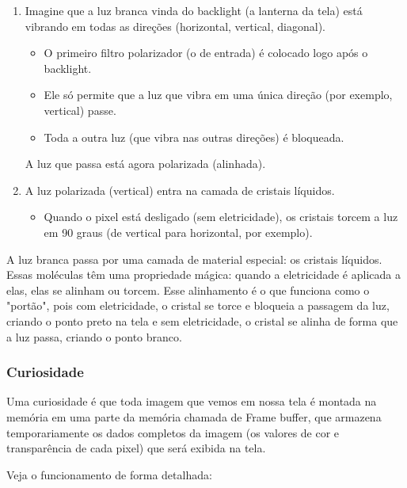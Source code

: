 \documentclass[12pt,a4paper]{report}
\begin{document}
	\begin{enumerate}
		\item Imagine que a luz branca vinda do backlight (a lanterna da tela) está vibrando em todas as direções (horizontal, vertical, diagonal).
		\begin{itemize}
			\item O primeiro filtro polarizador (o de entrada) é colocado logo após o backlight.
			\item Ele só permite que a luz que vibra em uma única direção (por exemplo, vertical) passe.
			\item Toda a outra luz (que vibra nas outras direções) é bloqueada.
		\end{itemize}
		A luz que passa está agora polarizada (alinhada).
		
		\item A luz polarizada (vertical) entra na camada de cristais líquidos.
		\begin{itemize}
			\item Quando o pixel está desligado (sem eletricidade), os cristais torcem a luz em 90 graus (de vertical para horizontal, por exemplo).
		\end{itemize}
		
		
		
	\end{enumerate}
	
	A luz branca passa por uma camada de material especial: os cristais líquidos. Essas moléculas têm uma propriedade mágica: quando a eletricidade é aplicada a elas, elas se alinham ou torcem. Esse alinhamento é o que funciona como o "portão", pois com eletricidade, o cristal se torce e bloqueia a passagem da luz, criando o ponto preto na tela e sem eletricidade, o cristal se alinha de forma que a luz passa, criando o ponto branco.
	
	
	\subsubsection{Curiosidade}
	
	Uma curiosidade é que toda imagem que vemos em nossa tela é montada na memória em uma parte da memória chamada de Frame buffer, que armazena temporariamente os dados completos da imagem (os valores de cor e transparência de cada pixel) que será exibida na tela.
	
	Veja o funcionamento de forma detalhada:
	
\end{document}
